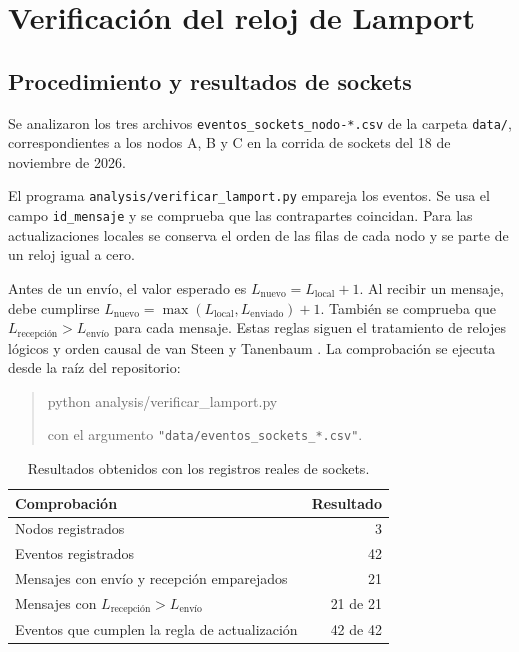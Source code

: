 \section{Verificación del reloj de Lamport}
\label{sec:lamport}

\subsection{Procedimiento y resultados de sockets}
Se analizaron los tres archivos \texttt{eventos\_sockets\_nodo-*.csv}
de la carpeta \texttt{data/}, correspondientes a los nodos A, B y C
en la corrida de sockets del 18 de noviembre de 2026.

El programa \texttt{analysis/}\allowbreak\texttt{verificar\_lamport.py} empareja los eventos.
Se usa el campo \texttt{id\_mensaje} y se comprueba que las
contrapartes coincidan. Para las actualizaciones locales se conserva el
orden de las filas de cada nodo y se parte de un reloj igual a cero.

Antes de un envío, el valor esperado es $L_{\mathrm{nuevo}}=L_{\mathrm{local}}+1$.
Al recibir un mensaje, debe cumplirse
$L_{\mathrm{nuevo}}=\max(L_{\mathrm{local}},L_{\mathrm{enviado}})+1$.
También se comprueba que
$L_{\text{recepción}}>L_{\text{envío}}$ para cada mensaje.
Estas reglas siguen el tratamiento de relojes lógicos y orden causal
de van Steen y Tanenbaum \cite{vansteen2023distributed}.
La comprobación se ejecuta desde la raíz del repositorio:

\begin{quote}\small\ttfamily
python analysis/verificar\_lamport.py\par
\normalfont\small con el argumento \texttt{"data/eventos\_sockets\_*.csv"}.
\end{quote}

\begin{table}[htbp]
\centering
\caption{Resultados obtenidos con los registros reales de sockets.}
\label{tab:lamport-resultados}
\begin{tabular}{lr}
\toprule
\textbf{Comprobación} & \textbf{Resultado} \\
\midrule
Nodos registrados & 3 \\
Eventos registrados & 42 \\
Mensajes con envío y recepción emparejados & 21 \\
Mensajes con $L_{\text{recepción}}>L_{\text{envío}}$ & 21 de 21 \\
Eventos que cumplen la regla de actualización & 42 de 42 \\
\bottomrule
\end{tabular}
\end{table}

